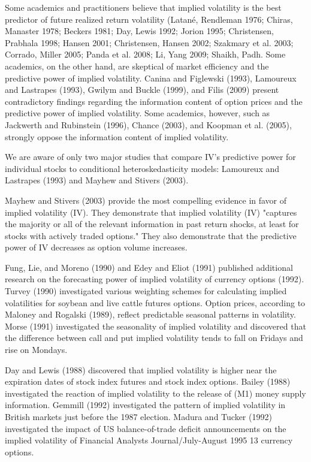 \documentclass[a4 paper, 12pt]{report}
\theoremstyle{plain}
\begin{document}
\par Some academics and practitioners believe that implied volatility is the best predictor of future realized return volatility (Latané, Rendleman 1976; Chiras, Manaster 1978; Beckers 1981; Day, Lewis 1992; Jorion 1995; Christensen, Prabhala 1998; Hansen 2001; Christensen, Hansen 2002; Szakmary et al. 2003; Corrado, Miller 2005; Panda et al. 2008; Li, Yang 2009; Shaikh, Padh. Some academics, on the other hand, are skeptical of market efficiency and the predictive power of implied volatility. Canina and Figlewski (1993), Lamoureux and Lastrapes (1993), Gwilym and Buckle (1999), and Filis (2009) present contradictory findings regarding the information content of option prices and the predictive power of implied volatility. Some academics, however, such as Jackwerth and Rubinstein (1996), Chance (2003), and Koopman et al. (2005), strongly oppose the information content of implied volatility.\\

\par We are aware of only two major studies that compare IV's predictive power for individual stocks to conditional heteroskedasticity models: Lamoureux and Lastrapes (1993) and Mayhew and Stivers (2003).\\
\par Mayhew and Stivers (2003) provide the most compelling evidence in favor of implied volatility (IV). They demonstrate that implied volatility (IV) "captures the majority or all of the relevant information in past return shocks, at least for stocks with actively traded options." They also demonstrate that the predictive power of IV decreases as option volume increases.\\

\par Fung, Lie, and Moreno (1990) and Edey and Eliot (1991) published additional research on the forecasting power of implied volatility of currency options (1992). Turvey (1990) investigated various weighting schemes for calculating implied volatilities for soybean and live cattle futures options.
Option prices, according to Maloney and Rogalski (1989), reflect predictable seasonal patterns in volatility. Morse (1991) investigated the seasonality of implied volatility and discovered that the difference between call and put implied volatility tends to fall on Fridays and rise on Mondays. \\

\par Day and Lewis (1988) discovered that implied volatility is higher near the expiration dates of stock index futures and stock index options. Bailey (1988) investigated the reaction of implied volatility to the release of (M1) money supply information. Gemmill (1992) investigated the pattern of implied volatility in British markets just before the 1987 election. Madura and Tucker (1992) investigated the impact of US balance-of-trade deficit announcements on the implied volatility of Financial Analysts Journal/July-August 1995 13 currency options.
\end{document}
